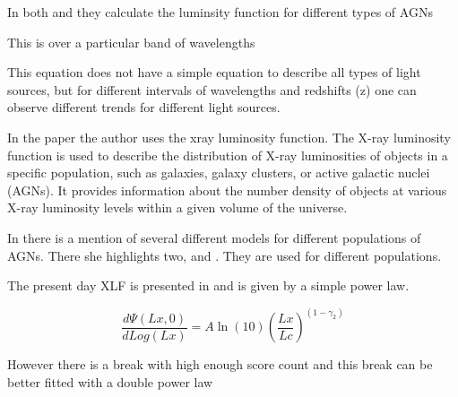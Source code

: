 \documentclass[11pt]{article}
\begin{document}
In both \cite{Ajello_2009} and \cite{Ueda_2003} they calculate the luminsity function for different types of AGNs



This is over a particular band of wavelengths


This equation does not have a simple equation to describe all types of light sources, but for different intervals of wavelengths and redshifts (z) one can observe different trends for different light sources. 

In the paper \cite{Jacobsen:2015mga} the author uses the xray luminosity function. The X-ray luminosity function is used to describe the distribution of X-ray luminosities of objects in a specific population, such as galaxies, galaxy clusters, or active galactic nuclei (AGNs). It provides information about the number density of objects at various X-ray luminosity levels within a given volume of the universe.


In \cite{Jacobsen:2015mga} there is a mention of several different models for different populations of AGNs. There she highlights two, \cite{Ajello_2009} and \cite{Ueda_2003}. They are used for different populations.

The present day XLF is presented in \cite{Ajello_2009} and is given by a simple power law. 

\begin{equation}
    \frac{d\Psi(Lx,0)}{dLog(Lx)} = A\ln (10){(\frac{Lx}{Lc})}^{(1-\gamma_2)}
\end{equation}

However there is a break with high enough score count and this break can be better fitted with a double power law 
\end{document}
